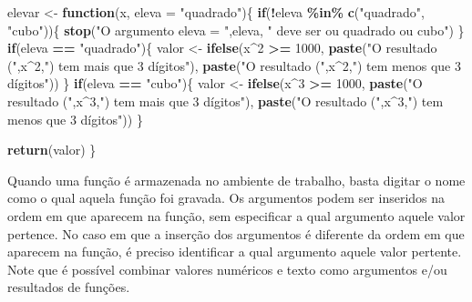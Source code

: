 \documentclass[
]{book}
\newenvironment{Shaded}{\begin{snugshade}}{\end{snugshade}}
\newcommand{\ControlFlowTok}[1]{\textcolor[rgb]{0.13,0.29,0.53}{\textbf{#1}}}
\newcommand{\DataTypeTok}[1]{\textcolor[rgb]{0.13,0.29,0.53}{#1}}
\newcommand{\DecValTok}[1]{\textcolor[rgb]{0.00,0.00,0.81}{#1}}
\newcommand{\KeywordTok}[1]{\textcolor[rgb]{0.13,0.29,0.53}{\textbf{#1}}}
\newcommand{\NormalTok}[1]{#1}
\newcommand{\OperatorTok}[1]{\textcolor[rgb]{0.81,0.36,0.00}{\textbf{#1}}}
\newcommand{\StringTok}[1]{\textcolor[rgb]{0.31,0.60,0.02}{#1}}
\numberwithin{equation}{section}
\begin{document}
\begin{Shaded}
\begin{Highlighting}[]
\NormalTok{elevar \textless{}{-}}\StringTok{ }\ControlFlowTok{function}\NormalTok{(x, }\DataTypeTok{eleva =} \StringTok{"quadrado"}\NormalTok{)\{}
  \ControlFlowTok{if}\NormalTok{(}\OperatorTok{!}\NormalTok{eleva }\OperatorTok{\%in\%}\StringTok{ }\KeywordTok{c}\NormalTok{(}\StringTok{"quadrado"}\NormalTok{, }\StringTok{"cubo"}\NormalTok{))\{}
    \KeywordTok{stop}\NormalTok{(}\StringTok{"O argumento eleva = "}\NormalTok{,eleva, }\StringTok{" deve ser ou \textquotesingle{}quadrado\textquotesingle{} ou \textquotesingle{}cubo\textquotesingle{}"}\NormalTok{)}
\NormalTok{  \}}
  \ControlFlowTok{if}\NormalTok{(eleva }\OperatorTok{==}\StringTok{ "quadrado"}\NormalTok{)\{}
\NormalTok{  valor \textless{}{-}}\StringTok{ }\KeywordTok{ifelse}\NormalTok{(x}\OperatorTok{\^{}}\DecValTok{2} \OperatorTok{\textgreater{}=}\StringTok{ }\DecValTok{1000}\NormalTok{,}
                 \KeywordTok{paste}\NormalTok{(}\StringTok{"O resultado ("}\NormalTok{,x}\OperatorTok{\^{}}\DecValTok{2}\NormalTok{,}\StringTok{") tem mais que 3 dígitos"}\NormalTok{),}
                 \KeywordTok{paste}\NormalTok{(}\StringTok{"O resultado ("}\NormalTok{,x}\OperatorTok{\^{}}\DecValTok{2}\NormalTok{,}\StringTok{") tem menos que 3 dígitos"}\NormalTok{))}
\NormalTok{  \}}
  \ControlFlowTok{if}\NormalTok{(eleva }\OperatorTok{==}\StringTok{ "cubo"}\NormalTok{)\{}
\NormalTok{  valor \textless{}{-}}\StringTok{ }\KeywordTok{ifelse}\NormalTok{(x}\OperatorTok{\^{}}\DecValTok{3} \OperatorTok{\textgreater{}=}\StringTok{ }\DecValTok{1000}\NormalTok{,}
                 \KeywordTok{paste}\NormalTok{(}\StringTok{"O resultado ("}\NormalTok{,x}\OperatorTok{\^{}}\DecValTok{3}\NormalTok{,}\StringTok{") tem mais que 3 dígitos"}\NormalTok{),}
                 \KeywordTok{paste}\NormalTok{(}\StringTok{"O resultado ("}\NormalTok{,x}\OperatorTok{\^{}}\DecValTok{3}\NormalTok{,}\StringTok{") tem menos que 3 dígitos"}\NormalTok{))}
\NormalTok{  \}}
                 
  \KeywordTok{return}\NormalTok{(valor)}
\NormalTok{\}}
\end{Highlighting}
\end{Shaded}

Quando uma função é armazenada no ambiente de trabalho, basta digitar o nome como o qual aquela função foi gravada. Os argumentos podem ser inseridos na ordem em que aparecem na função, sem especificar a qual argumento aquele valor pertence. No caso em que a inserção dos argumentos é diferente da ordem em que aparecem na função, é preciso identificar a qual argumento aquele valor pertente. Note que é possível combinar valores numéricos e texto como argumentos e/ou resultados de funções.
\end{document}
